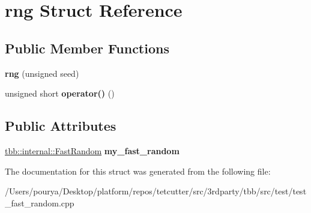 \hypertarget{structrng}{}\section{rng Struct Reference}
\label{structrng}
\subsection*{Public Member Functions}
\begin{DoxyCompactItemize}
\item 
\hypertarget{structrng_a2e66192369bb3badc3ca417c547d99bc}{}{\bfseries rng} (unsigned seed)\label{structrng_a2e66192369bb3badc3ca417c547d99bc}

\item 
\hypertarget{structrng_a66e576b59be59c6ea620cedc986e8d96}{}unsigned short {\bfseries operator()} ()\label{structrng_a66e576b59be59c6ea620cedc986e8d96}

\end{DoxyCompactItemize}
\subsection*{Public Attributes}
\begin{DoxyCompactItemize}
\item 
\hypertarget{structrng_ab7a068b06c4cb41d9b50f01994aa3ecc}{}\hyperlink{classtbb_1_1internal_1_1FastRandom}{tbb\+::internal\+::\+Fast\+Random} {\bfseries my\+\_\+fast\+\_\+random}\label{structrng_ab7a068b06c4cb41d9b50f01994aa3ecc}

\end{DoxyCompactItemize}


The documentation for this struct was generated from the following file\+:\begin{DoxyCompactItemize}
\item 
/\+Users/pourya/\+Desktop/platform/repos/tetcutter/src/3rdparty/tbb/src/test/test\+\_\+fast\+\_\+random.\+cpp\end{DoxyCompactItemize}
